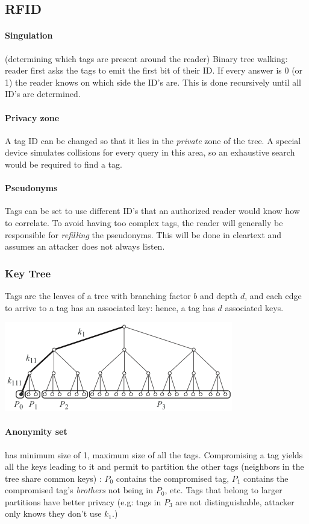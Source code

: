 \documentclass[10pt, a4paper,twocolumn]{scrartcl}
\begin{document}
\subsection{RFID}
\paragraph{Singulation} (determining which tags are present around the reader) Binary tree walking: reader first asks the tags to emit the first bit of their ID. If every answer is 0 (or 1) the reader knows on which side the ID's are. This is done recursively until all ID's are determined.

\paragraph{Privacy zone} A tag ID can be changed so that it lies in the \emph{private} zone of the tree. A special device simulates collisions for every query in this area, so an exhaustive search would be required to find a tag. 

\paragraph{Pseudonyms} Tags can be set to use different ID's that an authorized reader would know how to correlate. To avoid having too complex tags, the reader will generally be responsible for \emph{refilling} the pseudonyms. This will be done in cleartext and assumes an attacker does not always listen.

\subsubsection{Key Tree}
Tags are the leaves of a tree with branching factor $b$ and depth $d$, and each edge to arrive to a tag has an associated key: hence, a tag has $d$ associated keys.
\begin{center}
\includegraphics[width=0.7\columnwidth]{img/anon_set.png}
\end{center}

\paragraph{Anonymity set} has minimum size of 1, maximum size of all the tags. Compromising a tag yields all the keys leading to it and permit to partition the other tags (neighbors in the tree share common keys) : $P_0$ contains the compromised tag, $P_1$ contains the compromised tag's \emph{brothers} not being in $P_0$, etc. Tags that belong to larger partitions have better privacy (e.g: tags in $P_3$ are not distinguishable, attacker only knows they don't use $k_1$.)
\end{document}
